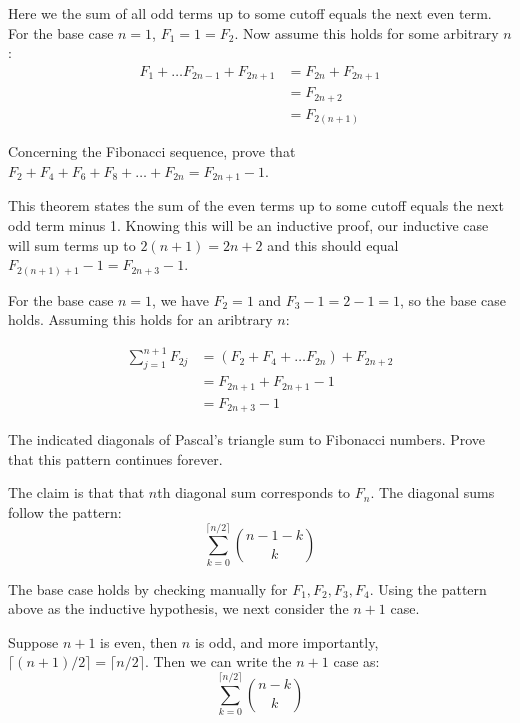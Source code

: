 \documentclass{article}
\begin{document}
Here we the sum of all odd terms up to some cutoff equals the next even term. For the base case $n = 1$, $F_1 = 1 = F_2$. Now assume this holds for some arbitrary $n$:
\begin{align*}
  F_1 + \ldots F_{2n-1} + F_{2n+1} & = F_{2n} + F_{2n+1} \\
                                   & = F_{2n+2}          \\
                                   & = F_{2(n+1)}
\end{align*}

\begin{problem}
Concerning the Fibonacci sequence, prove that $F_2 + F_4 + F_6 + F_8 + \ldots + F_{2n} = F_{2n+1} - 1$.
\end{problem}

This theorem states the sum of the even terms up to some cutoff equals the next odd term minus 1. Knowing this will be an inductive proof, our inductive case will sum terms up to $2(n+1) = 2n + 2$ and this should equal $F_{2(n+1) + 1} - 1 = F_{2n+3} - 1$.

For the base case $n = 1$, we have $F_2 = 1$ and $F_3 - 1 = 2 - 1 = 1$, so the base case holds. Assuming this holds for an aribtrary $n$:

\begin{align*}
  \sum_{j=1}^{n+1} F_{2j} & = (F_2 + F_4 + \ldots F_{2n}) + F_{2n+2} \\
                          & = F_{2n+1} + F_{2n + 1} - 1              \\
                          & = F_{2n+3} - 1
\end{align*}

\begin{problem}
The indicated diagonals of Pascal's triangle sum to Fibonacci numbers. Prove that this pattern continues forever.
\end{problem}

The claim is that that $n$th diagonal sum corresponds to $F_n$. The diagonal sums follow the pattern:
$$\sum_{k=0}^{\lceil n/2 \rceil} \binom{n - 1 - k}{k}$$

The base case holds by checking manually for $F_1, F_2, F_3, F_4$. Using the pattern above as the inductive hypothesis, we next consider the $n+1$ case.

Suppose $n + 1$ is even, then $n$ is odd, and more importantly, $\lceil (n+1) / 2 \rceil = \lceil n / 2 \rceil$. Then we can write the $n+1$ case as:
$$\sum_{k=0}^{\lceil n / 2 \rceil} \binom{n - k}{k}$$
\end{document}
